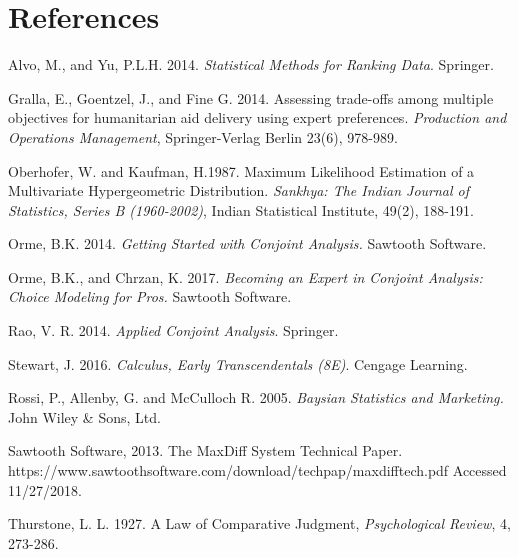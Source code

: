 \documentclass[a4paper, 12pt]{article}
\begin{document}
\section*{References}
\begin{list}{}{\itemindent=-2em}
\small
\item Alvo, M., and Yu, P.L.H. 2014. \emph{Statistical Methods for Ranking Data}. Springer.

\item Gralla, E., Goentzel, J., and Fine G. 2014. Assessing trade-offs among multiple objectives for humanitarian aid delivery using expert preferences.
\emph{Production and Operations Management}, Springer-Verlag Berlin 23(6), 978-989.

\item Oberhofer, W. and Kaufman, H.1987.  Maximum Likelihood Estimation of a Multivariate Hypergeometric Distribution. \emph{Sankhya: The Indian Journal of Statistics, Series B (1960-2002)}, Indian Statistical Institute, 49(2), 188-191. 

\item Orme, B.K. 2014. \emph{Getting Started with Conjoint Analysis.} Sawtooth Software.

\item Orme, B.K., and Chrzan, K. 2017. \emph{Becoming an Expert in Conjoint Analysis: Choice Modeling for Pros.} Sawtooth Software.

\item Rao, V. R. 2014. \emph{Applied Conjoint Analysis}. Springer.

\item  Stewart, J. 2016.  \emph{Calculus, Early Transcendentals (8E)}. Cengage Learning.

\item Rossi, P., Allenby, G. and McCulloch R. 2005. \emph{Baysian Statistics and Marketing.} John Wiley \& Sons, Ltd.

\item Sawtooth Software, 2013. The MaxDiff System Technical Paper. https://www.sawtoothsoftware.com/download/techpap/maxdifftech.pdf Accessed 11/27/2018.

\item Thurstone, L. L. 1927. A Law of Comparative Judgment, \emph{Psychological Review}, 4, 273-286.
\end{list}
\end{document}
